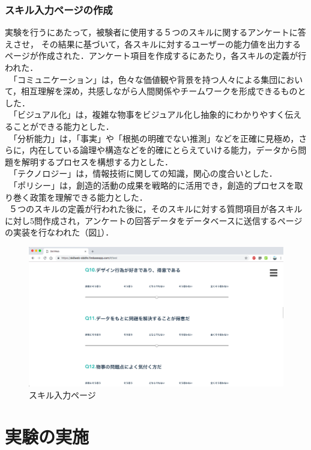 \documentclass{funthesis}
\begin{document}
\subsubsection{スキル入力ページの作成}
実験を行うにあたって，被験者に使用する５つのスキルに関するアンケートに答えさせ，
その結果に基づいて，各スキルに対するユーザーの能力値を出力するページが作成された．アンケート項目を作成するにあたり，各スキルの定義が行われた．\\
\ 「コミュニケーション」は，色々な価値観や背景を持つ人々による集団において，相互理解を深め，共感しながら人間関係やチームワークを形成できるものとした．\\
\ 「ビジュアル化」は，複雑な物事をビジュアル化し抽象的にわかりやすく伝えることができる能力とした．\\
\ 「分析能力」は，「事実」や「根拠の明確でない推測」などを正確に見極め，さらに，内在している論理や構造などを的確にとらえていける能力，データから問題を解明するプロセスを構想する力とした．\\
\ 「テクノロジー」は，情報技術に関しての知識，関心の度合いとした．\\
\ 「ポリシー」は，創造的活動の成果を戦略的に活用でき，創造的プロセスを取り巻く政策を理解できる能力とした．\\
\ ５つのスキルの定義が行われた後に，そのスキルに対する質問項目が各スキルに対し5問作成され，アンケートの回答データをデータベースに送信するページの実装を行なわれた（図\ref{testtest}）．

\begin{figure}[h]
 \centering
   \includegraphics[width=150mm]{figures/test.png}
 \caption{スキル入力ページ}
 \label{testtest}
\end{figure}

\section{実験の実施}
\end{document}
